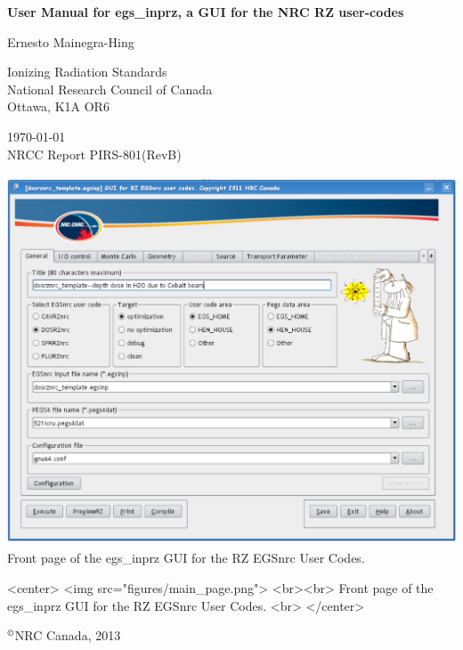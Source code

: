 \documentclass[12pt,twoside]{article}   %
\newcommand{\supcopyright}{$^{\copyright}$}       %
\begin{document}
\begin{center} 
{\sffamily \bfseries {\Huge User Manual for egs\_inprz, a GUI for the NRC RZ user-codes}
\vspace{5mm}\\}
\begin{Large}
Ernesto Mainegra-Hing \\
\end{Large}
Ionizing Radiation Standards\\
National Research Council of Canada
\\Ottawa, K1A OR6\\
\vspace{10mm}

\today \vspace{3mm}\\
\hfill NRCC Report {\sf PIRS-801}(RevB) \vspace*{10mm}\\

\begin{latexonly}
\begin{center}
\includegraphics[height=11cm]{figures/main_page}
\vspace{5mm}
\\Front page of the egs\_inprz GUI for the RZ EGSnrc User Codes.
\vspace{10mm}\\
\end{center}
\end{latexonly}
\begin{htmlonly}
\begin{rawhtml}
<center>
<img src="figures/main_page.png">
<br><br>
Front page of the egs\_inprz GUI for the RZ EGSnrc User Codes. 
<br>
</center>
\end{rawhtml}
\end{htmlonly}

\supcopyright NRC Canada, 2013

\end{center}
\newpage   %
\mbox{}
\end{document}
